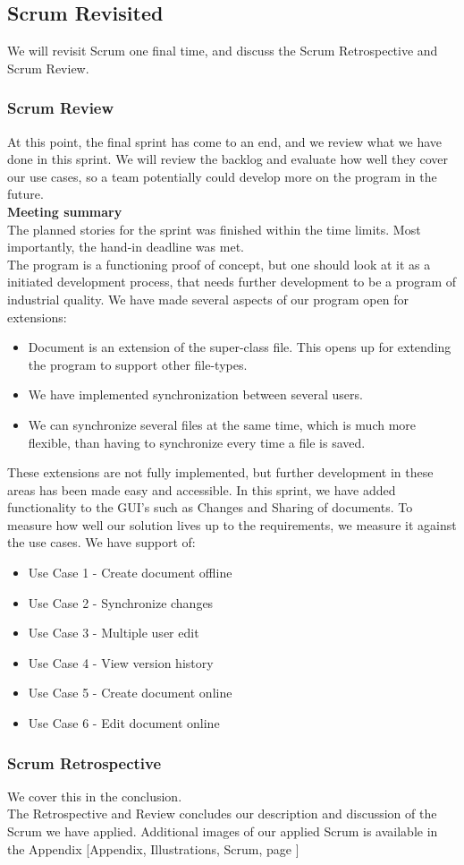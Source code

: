\subsection{Scrum Revisited}
We will revisit Scrum one final time, and discuss the Scrum Retrospective and Scrum Review.
\subsubsection{Scrum Review}
At this point, the final sprint has come to an end, and we review what we have done in this sprint. We will review the backlog and evaluate how well they cover our use cases, so a team potentially could develop more on the program in the future.  \\
\newline
\textbf{Meeting summary}\\
The planned stories for the sprint was finished within the time limits. Most importantly, the hand-in deadline was met.\\
The program is a functioning proof of concept, but one should look at it as a initiated development process, that needs further development to be a program of industrial quality. We have made several aspects of our program open for extensions:
\begin{itemize}
\item Document is an extension of the super-class file. This opens up for extending the program to support other file-types.
\item We have implemented synchronization between several users.
\item We can synchronize several files at the same time, which is much more flexible, than having to synchronize every time a file is saved.
\end{itemize}
These extensions are not fully implemented, but further development in these areas has been made easy and accessible.
In this sprint, we have added functionality to the GUI's such as Changes and Sharing of documents. To measure how well our solution lives up to the requirements, we measure it against the use cases. We have support of:
\begin{itemize}
\item Use Case 1 - Create document offline
\item Use Case 2 - Synchronize changes
\item Use Case 3 - Multiple user edit 
\item Use Case 4 - View version history
\item Use Case 5 - Create document online
\item Use Case 6 - Edit document online
\end{itemize}
\subsubsection{Scrum Retrospective}
We cover this in the conclusion.\\
\newline
The Retrospective and Review concludes our description and discussion of the Scrum we have applied. Additional images of our applied Scrum is available in the Appendix [Appendix, Illustrations, Scrum, page \pageref{scrumillustrations}]
\newpage